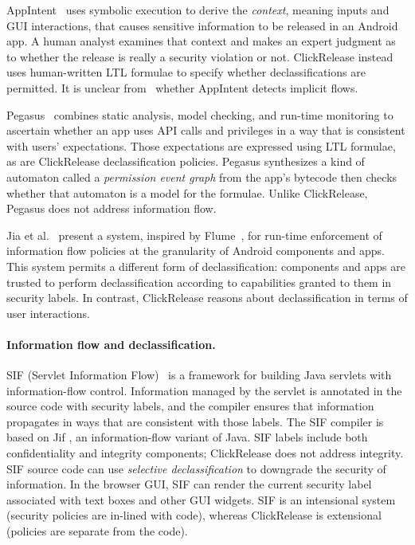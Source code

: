 \documentclass{llncs}
\newcommand{\toolname}{ClickRelease\xspace}
\begin{document}
AppIntent~\cite{Yang:2013} uses symbolic execution to derive the \emph{context},
meaning inputs and GUI interactions, that causes sensitive information to be
released in an Android app. A human analyst examines that context and makes an
expert judgment as to whether the release is really a security violation or not.  
\toolname instead uses human-written LTL formulae to specify whether 
declassifications are permitted. It is unclear from~\cite{Yang:2013} whether AppIntent detects
implicit flows.

Pegasus~\cite{Chen:13} combines static analysis, model checking,
and run-time monitoring to ascertain whether an app uses API
calls and privileges in a way that is consistent with users' expectations.
Those expectations are expressed using LTL formulae, as are \toolname 
declassification policies.  Pegasus synthesizes
a kind of automaton called a \emph{permission event graph} from the
app's bytecode then checks whether that automaton is a model for the formulae.
Unlike \toolname, Pegasus does not address information flow.

Jia et al.~\cite{Jia:13} present a system, inspired by Flume~\cite{Krohn:2007},
for run-time enforcement of information flow policies at the granularity of 
Android components and apps.  This system permits a different form of declassification:
components and apps are trusted to perform declassification according to 
capabilities granted to them in security labels.  In contrast,
\toolname reasons about declassification in terms of user
interactions.

\paragraph*{Information flow and declassification.}

SIF (Servlet Information Flow)~\cite{Chong:07} is a framework for building
Java servlets with information-flow control.  Information managed by
the servlet is annotated in the source code with security labels, and the compiler 
ensures that information propagates in ways that are consistent with
those labels.  
The SIF compiler is based on Jif \cite{Myers:1999}, an information-flow variant of Java.  
SIF labels include both confidentiality and integrity components;
\toolname{} does not address integrity.
SIF source code can use \emph{selective declassification} to downgrade the security
of information.
In the browser GUI, SIF can render the current security label
associated with text boxes and other GUI widgets.  
SIF is an intensional system (security policies are in-lined with code), whereas
\toolname is extensional (policies are separate from the code).
\end{document}
